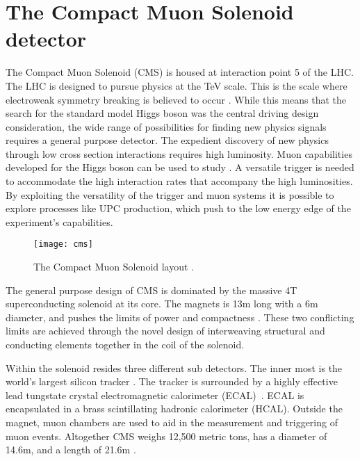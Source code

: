 \chapter{\label{ch:detector} The Compact Muon Solenoid detector}	
  The Compact Muon Solenoid (CMS) is housed at interaction point 5 of the 
    LHC. 
  The LHC is designed to pursue physics at the TeV scale. 
  This is the scale where electroweak symmetry breaking is believed to occur
  	\cite{CmsPTdrv2}.
  While this means that the search for the standard model Higgs boson was the 
    central driving design consideration, the wide range of possibilities for
  	finding new physics signals requires a general purpose detector.
  The expedient discovery of new physics through low cross section interactions 
  	requires high luminosity.
  Muon capabilities developed for the Higgs boson can be used to study \JPsi{}. 
  A versatile trigger is needed to accommodate the high interaction rates that 
    accompany the high luminosities. 
  By exploiting the versatility of the trigger and muon systems it
    is possible to explore processes like UPC \JPsi{} production, 
    which push to the low energy edge of the experiment's capabilities. 
  \begin{figure}[h]
    \centering
      \texttt{[image: cms]}
    \caption{The Compact Muon Solenoid layout \cite{tCmsE}.}
    \label{cms}
  \end{figure}
  
  The general purpose design of CMS is dominated by the massive 4T 
  	superconducting solenoid at its core.
  The magnets is 13m long with a 6m diameter, and pushes the limits of power
  	and compactness \cite{tCmsE}. 
  These two conflicting limits are achieved through the novel design of 
  	interweaving structural and conducting elements together in the coil of
  	the solenoid.

  Within the solenoid resides three different sub detectors.
  The inner most is the world's largest silicon tracker \cite{tCmsE}.
  The tracker is surrounded by a highly effective lead tungstate crystal 
    electromagnetic calorimeter (ECAL)~\cite{CMS:2002xia}.
  ECAL is encapsulated in a brass scintillating hadronic calorimeter (HCAL).
  Outside the magnet, muon chambers are used to aid in the measurement and 
    triggering of muon events. 
  Altogether CMS weighs 12,500 metric tons, has a diameter of 14.6m,
    and a length of 21.6m \cite{tCmsE}.

